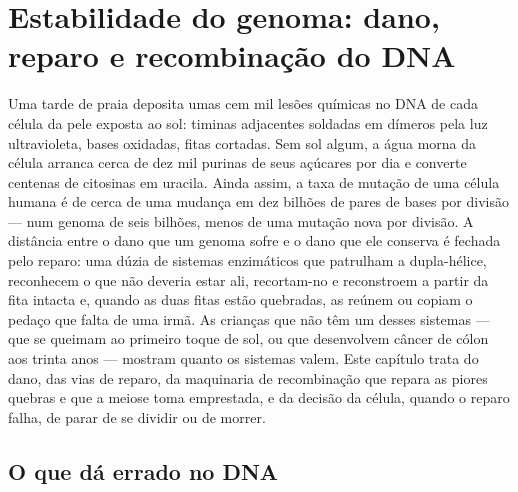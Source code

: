 \chapter{Estabilidade do genoma: dano, reparo e recombinação do DNA}\label{ch:b3:dna-repair}

Uma tarde de praia deposita umas cem mil lesões químicas no DNA de
cada célula da pele exposta ao sol: timinas adjacentes soldadas em
dímeros pela luz ultravioleta, bases oxidadas, fitas cortadas. Sem sol
algum, a água morna da célula arranca cerca de dez mil purinas de seus
açúcares por dia e converte centenas de citosinas em uracila. Ainda
assim, a taxa de mutação de uma célula humana é de cerca de uma
mudança em dez bilhões de pares de bases por divisão --- num genoma de
seis bilhões, menos de uma mutação nova por divisão. A distância entre
o dano que um genoma sofre e o dano que ele conserva é fechada pelo
reparo: uma dúzia de sistemas enzimáticos que patrulham a
dupla-hélice, reconhecem o que não deveria estar ali, recortam-no e
reconstroem a partir da fita intacta e, quando as duas fitas estão
quebradas, as reúnem ou copiam o pedaço que falta de uma irmã. As
crianças que não têm um desses sistemas --- que se queimam ao primeiro
toque de sol, ou que desenvolvem câncer de cólon aos trinta anos ---
mostram quanto os sistemas valem. Este capítulo trata do dano, das
vias de reparo, da maquinaria de recombinação que repara as piores
quebras e que a meiose toma emprestada, e da decisão da célula,
quando o reparo falha, de parar de se dividir ou de morrer.

\section{O que dá errado no DNA}

